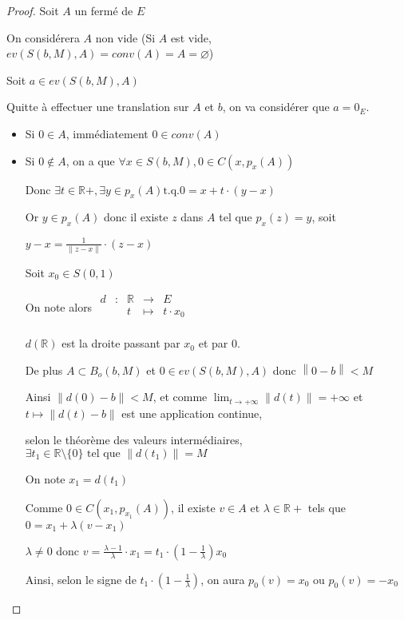 \documentclass[a4paper]{article}
\newcommand{\norm}[1]{\left\lVert#1\right\rVert}
\begin{document}
\begin{proof}
Soit $A$ un fermé de $E$

On considérera $A$ non vide (Si $A$ est vide, $ev(S(b, M), A) = conv(A) = A = \varnothing$)

Soit $a \in ev(S(b, M), A)$

Quitte à effectuer une translation sur $A$ et $b$, on va considérer que $a = 0_{E}$.

\begin{itemize}
\item Si $0 \in A$, immédiatement $0 \in conv(A)$
\item Si $0 \notin A$, on a que $\forall x \in S(b, M), 0 \in C(x, p_{x}(A))$

Donc $\exists t \in \mathbb{R}+, \exists y\in p_{x}(A) \text{t.q.} 0 = x + t \cdot (y - x)$

Or $y \in p_{x}(A)$ donc il existe $z$ dans $A$ tel que $p_{x}(z) = y$, soit

$y - x = \frac{1}{\norm{z - x}} \cdot (z - x)$

Soit $x_{0} \in S(0, 1)$

On note alors
$\begin{array}{ccccc}
d& : & \mathbb{R} & \to & E \\
 & & t & \mapsto & t \cdot x_{0} \\
\end{array}$

$d(\mathbb{R})$ est la droite passant par $x_{0}$  et par $0$.

De plus $A \subset B_{o}(b, M)$ et $0 \in ev(S(b, M), A)$ donc $\norm{0 - b} < M$

Ainsi $\norm{d(0) - b} < M$, et comme $\lim_{t \to +\infty}\norm{d(t)} = +\infty$ et $t \mapsto \norm{d(t) - b}$ est une application continue,

selon le théorème des valeurs intermédiaires, $\exists t_{1} \in \mathbb{R}\setminus\{0\} \text{ tel que } \norm{d(t_{1})} = M$

On note $x_{1} = d(t_{1})$

Comme $0 \in C(x_{1}, p_{x_{1}}(A))$, il existe $v \in A$ et $\lambda \in \mathbb{R}+$ tels que $0 = x_{1} + \lambda (v - x_{1})$

$\lambda \neq 0$ donc $v = \frac{\lambda - 1}{\lambda} \cdot x_{1} = t_{1} \cdot (1 - \frac{1}{\lambda}) x_{0}$

Ainsi, selon le signe de $t_{1} \cdot (1 - \frac{1}{\lambda})$, on aura $p_{0}(v) = x_{0}$ ou $p_{0}(v) = - x_{0}$


\end{itemize}
\end{proof}
\end{document}
